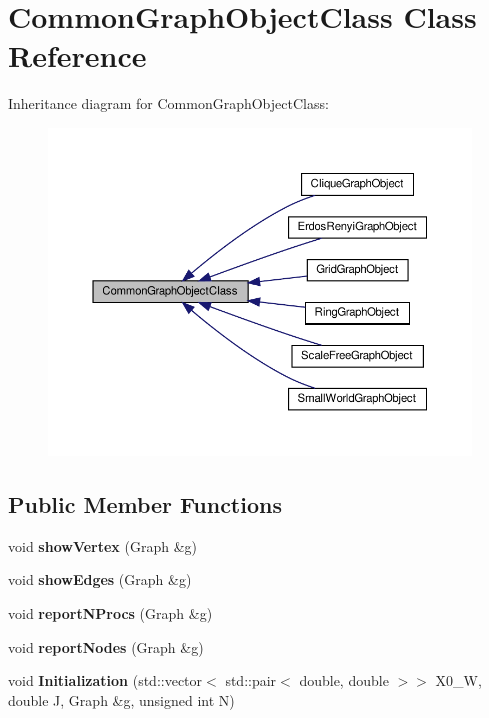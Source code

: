 \hypertarget{classCommonGraphObjectClass}{}\section{Common\+Graph\+Object\+Class Class Reference}
\label{classCommonGraphObjectClass}


Inheritance diagram for Common\+Graph\+Object\+Class\+:
\nopagebreak
\begin{figure}[H]
\begin{center}
\leavevmode
\includegraphics[width=350pt]{classCommonGraphObjectClass__inherit__graph}
\end{center}
\end{figure}
\subsection*{Public Member Functions}
\begin{DoxyCompactItemize}
\item 
\mbox{\label{classCommonGraphObjectClass_aa9c64c62cc9660a8c261f660ccca4d68}} 
void {\bfseries show\+Vertex} (Graph \&g)
\item 
\mbox{\label{classCommonGraphObjectClass_a7ba9ff5d091d1e5b29f8b7fcd6215e53}} 
void {\bfseries show\+Edges} (Graph \&g)
\item 
\mbox{\label{classCommonGraphObjectClass_ac193f6ba2806127a365aa391db9e2fa8}} 
void {\bfseries report\+N\+Procs} (Graph \&g)
\item 
\mbox{\label{classCommonGraphObjectClass_a538f35e0b827018171beed35c579d3af}} 
void {\bfseries report\+Nodes} (Graph \&g)
\item 
\mbox{\label{classCommonGraphObjectClass_a6239be7bef168bc0c13301f50f50b05d}} 
void {\bfseries Initialization} (std\+::vector$<$ std\+::pair$<$ double, double $>$$>$ X0\+\_\+W, double J, Graph \&g, unsigned int N)
\end{DoxyCompactItemize}


